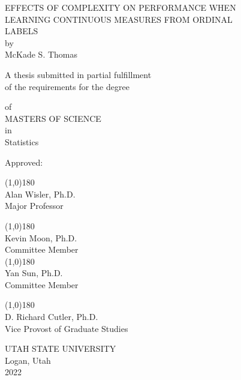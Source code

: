 \documentclass[10pt]{article}\usepackage[]{graphicx}\usepackage[]{xcolor}
\begin{document}
\author{McKade Thomas}
\begin{titlepage}
    \begin{center}
    \Large
    EFFECTS OF COMPLEXITY ON PERFORMANCE WHEN \\
    LEARNING CONTINUOUS MEASURES FROM ORDINAL \\
    LABELS \\
    by \\
    McKade S. Thomas \\
    \begin{singlespace}
    A thesis submitted in partial fulfillment \\
    of the requirements for the degree \\
    \end{singlespace}
    of \\
    MASTERS OF SCIENCE \\
    in \\
    Statistics \\
    \end{center}

\hfill \break
\hfill \break
\large
Approved:
\begin{multicols}{2}

\line(1,0){180} \\
Alan Wisler, Ph.D. \\
Major Professor

\line(1,0){180} \\
Kevin Moon, Ph.D. \\
Committee Member \\

\line(1,0){180} \\
Yan Sun, Ph.D. \\
Committee Member

\line(1,0){180} \\
D. Richard Cutler, Ph.D. \\
Vice Provost of Graduate Studies \\

\end{multicols}

\begin{center}
UTAH STATE UNIVERSITY \\
Logan, Utah \\
2022
\end{center}

\end{titlepage}
\end{document}
